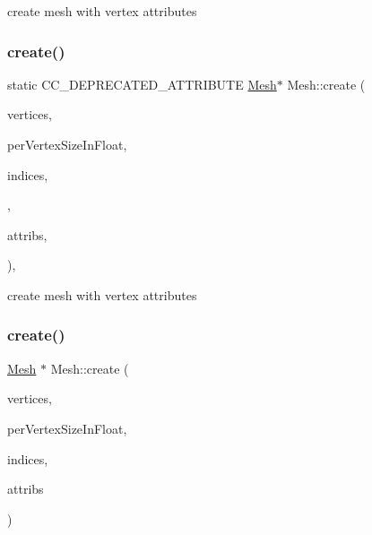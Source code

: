 create mesh with vertex attributes \mbox{\label{classMesh_ab2b8bb244d820e123a75a21d43fc4e6d}} 
\subsubsection{\texorpdfstring{create()}{create()}\hspace{0.1cm}{\footnotesize\ttfamily [4/8]}}
{\footnotesize\ttfamily static C\+C\+\_\+\+D\+E\+P\+R\+E\+C\+A\+T\+E\+D\+\_\+\+A\+T\+T\+R\+I\+B\+U\+TE \hyperlink{classMesh}{Mesh}$\ast$ Mesh\+::create (\begin{DoxyParamCaption}\item[{const std\+::vector$<$ float $>$ \&}]{vertices,  }\item[{int}]{per\+Vertex\+Size\+In\+Float,  }\item[{const Index\+Array \&}]{indices,  }\item[{int}]{,  }\item[{const std\+::vector$<$ \hyperlink{structMeshVertexAttrib}{Mesh\+Vertex\+Attrib} $>$ \&}]{attribs,  }\item[{int}]{ }\end{DoxyParamCaption})\hspace{0.3cm}{\ttfamily [inline]}, {\ttfamily [static]}}

create mesh with vertex attributes \mbox{\label{classMesh_a3f5fa215cad0007671d2fc8fd799f009}} 
\subsubsection{\texorpdfstring{create()}{create()}\hspace{0.1cm}{\footnotesize\ttfamily [5/8]}}
{\footnotesize\ttfamily \hyperlink{classMesh}{Mesh} $\ast$ Mesh\+::create (\begin{DoxyParamCaption}\item[{const std\+::vector$<$ float $>$ \&}]{vertices,  }\item[{int}]{per\+Vertex\+Size\+In\+Float,  }\item[{const Index\+Array \&}]{indices,  }\item[{const std\+::vector$<$ \hyperlink{structMeshVertexAttrib}{Mesh\+Vertex\+Attrib} $>$ \&}]{attribs }\end{DoxyParamCaption})\hspace{0.3cm}{\ttfamily [static]}}

